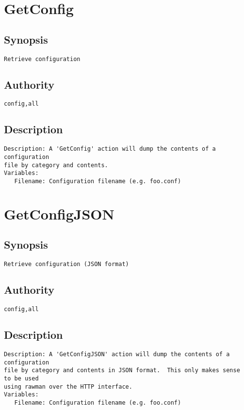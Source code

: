 \section{GetConfig}
\subsection{Synopsis}
\begin{verbatim}
Retrieve configuration
\end{verbatim}
\subsection{Authority}
\begin{verbatim}
config,all
\end{verbatim}
\subsection{Description}
\begin{verbatim}
Description: A 'GetConfig' action will dump the contents of a configuration
file by category and contents.
Variables:
   Filename: Configuration filename (e.g. foo.conf)

\end{verbatim}


\section{GetConfigJSON}
\subsection{Synopsis}
\begin{verbatim}
Retrieve configuration (JSON format)
\end{verbatim}
\subsection{Authority}
\begin{verbatim}
config,all
\end{verbatim}
\subsection{Description}
\begin{verbatim}
Description: A 'GetConfigJSON' action will dump the contents of a configuration
file by category and contents in JSON format.  This only makes sense to be used
using rawman over the HTTP interface.
Variables:
   Filename: Configuration filename (e.g. foo.conf)

\end{verbatim}


